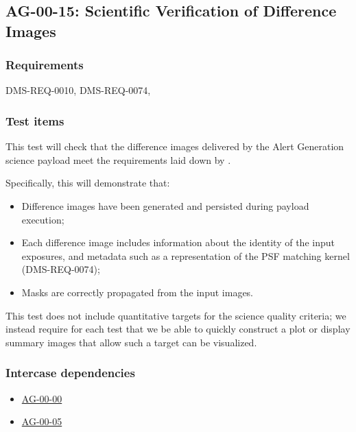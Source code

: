 \subsection{AG-00-15: Scientific Verification of Difference Images}
\label{ag-00-15}

\subsubsection{Requirements}

DMS-REQ-0010, DMS-REQ-0074, 

\subsubsection{Test items}
\label{ag-00-15-items}

This test will check that the difference images delivered by the
Alert Generation science payload meet the requirements laid down by .

Specifically, this will demonstrate that:

\begin{itemize}

  \item{Difference images have been generated and persisted during
  payload execution;}
  \item{Each difference image includes information about the identity of
	the input exposures, and metadata such as a representation of the
		PSF matching kernel (DMS-REQ-0074);}
  \item{Masks are correctly propagated from the input images.}

\end{itemize}

This test does not include quantitative targets for the science quality criteria; we instead require for each test that we be able to quickly construct a plot or display summary images that allow such a target can be visualized.

\subsubsection{Intercase dependencies}

\begin{itemize}

  \item{\hyperref[ag-00-00]{AG-00-00}}
  \item{\hyperref[ag-00-05]{AG-00-05}}

\end{itemize}

